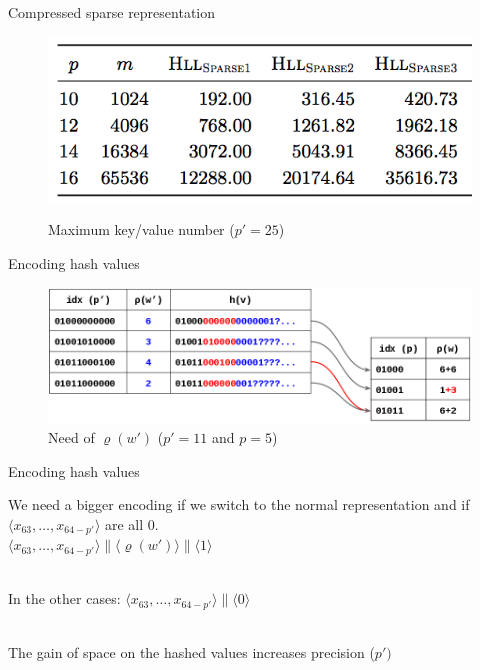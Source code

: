 \documentclass{beamer}
\begin{document}
\begin{frame}{Compressed sparse representation}

\begin{figure}[c]
\includegraphics [scale=0.45]  {sparse123.png}

Maximum key/value number ($p' = 25$)
\end{figure}

\end{frame}


\begin{frame}{Encoding hash values}
\begin{figure}[c]
\includegraphics[scale=0.45]{encoding_hash.png}
\caption{Need of $\varrho(w\prime)$ ($p' = 11$ and $p = 5$)}
\end{figure}
\end{frame}

\begin{frame}{Encoding hash values}

  We need a bigger encoding if we switch to the normal representation
  and if $\langle x_{63}, \dots, x_{64-p\prime} \rangle$ are all 0.
  ~\\
  \colorbox{light-gray}{$\langle x_{63}, \dots, x_{64-p\prime} \rangle \| \langle \varrho (w\prime) \rangle \| \langle 1 \rangle $}

  ~\\
  In the other cases:
  \colorbox{light-gray}{$\langle x_{63}, \dots, x_{64-p\prime} \rangle \| \langle 0 \rangle $}

  ~\\
  The gain of space on the hashed values increases precision ($p\prime)$

\end{frame}
\end{document}
